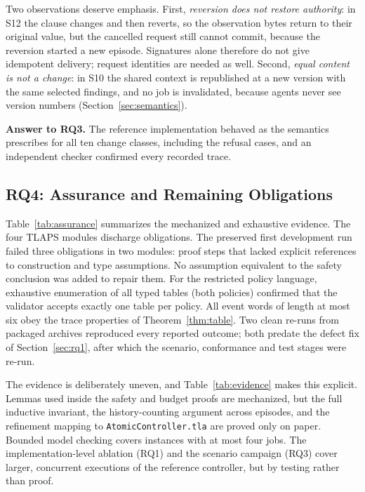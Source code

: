 \documentclass[10pt,journal,compsoc]{IEEEtran}
\theoremstyle{plain}
\theoremstyle{definition}
\begin{document}


Two observations deserve emphasis. First, \emph{reversion does not restore authority}: in S12 the clause changes and then reverts, so the observation bytes return to their original value, but the cancelled request still cannot commit, because the reversion started a new episode. Signatures alone therefore do not give idempotent delivery; request identities are needed as well. Second, \emph{equal content is not a change}: in S10 the shared context is republished at a new version with the same selected findings, and no job is invalidated, because agents never see version numbers (Section~\ref{sec:semantics}).

\textbf{Answer to RQ3.} The reference implementation behaved as the semantics prescribes for all ten change classes, including the refusal cases, and an independent checker confirmed every recorded trace.

\subsection{RQ4: Assurance and Remaining Obligations}\label{sec:rq4}
Table~\ref{tab:assurance} summarizes the mechanized and exhaustive evidence. The four TLAPS modules discharge \ProvedObligations{} obligations. The preserved first development run failed three obligations in two modules: proof steps that lacked explicit references to construction and type assumptions. No assumption equivalent to the safety conclusion was added to repair them. For the restricted policy language, exhaustive enumeration of all \PolicyTables{} typed tables (both policies) confirmed that the validator accepts exactly one table per policy. All \EventWords{} event words of length at most six obey the trace properties of Theorem~\ref{thm:table}. Two clean re-runs from packaged archives reproduced every reported outcome; both predate the defect fix of Section~\ref{sec:rq1}, after which the scenario, conformance and test stages were re-run.



The evidence is deliberately uneven, and Table~\ref{tab:evidence} makes this explicit. Lemmas used inside the safety and budget proofs are mechanized, but the full inductive invariant, the history-counting argument across episodes, and the refinement mapping to \texttt{AtomicController.tla} are proved only on paper. Bounded model checking covers instances with at most four jobs. The implementation-level ablation (RQ1) and the scenario campaign (RQ3) cover larger, concurrent executions of the reference controller, but by testing rather than proof.
\end{document}
